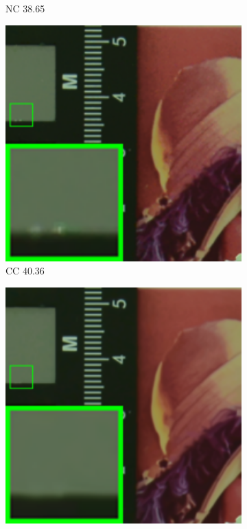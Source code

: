 \begin{figure}
\begin{subfigure}[t]{0.19\textwidth}
		\caption{NC 38.65}
    \end{subfigure}
    \hfill
    \begin{subfigure}[t]{0.19\textwidth}
        \centering
        \includegraphics[width=1\textwidth]{images/mcwnnm/cc/resize_br_CC_d800_iso1600_2.png}
		\caption{CC 40.36}
    \end{subfigure}
    \hfill
    \begin{subfigure}[t]{0.19\textwidth}
        \centering
        \includegraphics[width=1\textwidth]{images/mcwnnm/cc/resize_br_WNNMJ_CC15_d800_iso1600_2.png}

\end{subfigure}
\end{figure}
